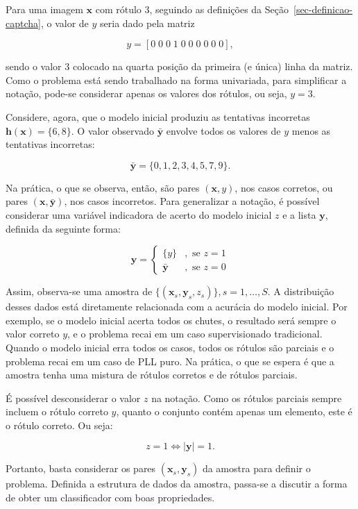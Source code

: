 \documentclass[12pt,twoside,brazilian]{book}
\begin{document}
Para uma imagem \(\mathbf x\) com rótulo \(3\), seguindo as definições
da Seção~\ref{sec-definicao-captcha}, o valor de \(y\) seria dado pela
matriz

\[
y = [0\;0\;0\;1\;0\;0\;0\;0\;0\;0],
\]

sendo o valor \(3\) colocado na quarta posição da primeira (e única)
linha da matriz. Como o problema está sendo trabalhado na forma
univariada, para simplificar a notação, pode-se considerar apenas os
valores dos rótulos, ou seja, \(y=3\).

Considere, agora, que o modelo inicial produziu as tentativas incorretas
\(\mathbf h(\mathbf x) = \{6,8\}\). O valor observado
\(\bar{\mathbf y}\) envolve todos os valores de \(y\) menos as
tentativas incorretas:

\[
\bar{\mathbf y} = \{0,1,2,3,4,5,7,9\}.
\]

Na prática, o que se observa, então, são pares \((\mathbf x,y)\), nos
casos corretos, ou pares \((\mathbf x,\bar{\mathbf y})\), nos casos
incorretos. Para generalizar a notação, é possível considerar uma
variável indicadora de acerto do modelo inicial \(z\) e a lista
\(\mathbf y\), definida da seguinte forma:

\[
\mathbf y = \left\{\begin{array}{cl}\{y\}&,\text{ se }z=1\\\bar{\mathbf y}&,\text{ se }z=0\end{array}\right.
\]

Assim, observa-se uma amostra de
\(\{(\mathbf x_s,\mathbf y_s, z_s)\}, s = 1,\dots,S\). A distribuição
desses dados está diretamente relacionada com a acurácia do modelo
inicial. Por exemplo, se o modelo inicial acerta todos os chutes, o
resultado será sempre o valor correto \(y\), e o problema recai em um
caso supervisionado tradicional. Quando o modelo inicial erra todos os
casos, todos os rótulos são parciais e o problema recai em um caso de
PLL puro. Na prática, o que se espera é que a amostra tenha uma mistura
de rótulos corretos e de rótulos parciais.

É possível desconsiderar o valor \(z\) na notação. Como os rótulos
parciais sempre incluem o rótulo correto \(y\), quanto o conjunto contém
apenas um elemento, este é o rótulo correto. Ou seja:

\[
z=1 \iff |\mathbf y|=1.
\]

Portanto, basta considerar os pares \((\mathbf x_s, \mathbf y_s)\) da
amostra para definir o problema. Definida a estrutura de dados da
amostra, passa-se a discutir a forma de obter um classificador com boas
propriedades.
\end{document}

